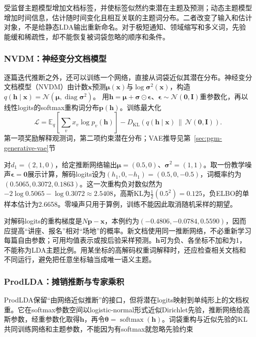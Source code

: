 受监督主题模型增加文档标签，并使标签似然约束潜在主题及预测；动态主题模型增加时间信息，估计随时间变化且相互关联的主题词分布。二者改变了输入和估计对象，不是给静态LDA输出重新命名。对于极短通知、领域缩写和多义词，先验能缓和稀疏性，却不能恢复被词袋忽略的顺序和条件。

\subsubsection{NVDM：神经变分文档模型}
\label{sec:nlp-classification-nvdm}

逐篇迭代推断之外，还可以训练一个网络，直接从词袋近似其潜在分布。神经变分文档模型（NVDM）由计数$\bm x$预测$\bm\mu(\bm x)$与$\log\bm\sigma^2(\bm x)$，构造
$q(\bm h\mid\bm x)=\mathcal N(\bm\mu,\operatorname{diag}\bm\sigma^2)$。
用$\bm h=\bm\mu+\bm\sigma\odot\bm\epsilon$、$\bm\epsilon\sim\mathcal N(\bm0,\bm I)$重参数化，再以线性logits的softmax重构词分布$\bm p(\bm h)$。训练最大化
\[
 \mathcal L=
 \mathbb E_q\!\left[\sum_vx_v\log p_v(\bm h)\right]
 -D_{\mathrm{KL}}(q(\bm h\mid\bm x)\,\|\,\mathcal N(\bm0,\bm I)).
\]
第一项奖励解释观测词，第二项约束潜在分布；VAE推导见第~\ref{sec:pgm-generative-vae}节

对$d_1=(2,1,0)$，给定推断网络输出$\bm\mu=(0.5,0)$、$\bm\sigma^2=(1,1)$。取一份教学噪声$\bm\epsilon=\bm0$展示计算，解码logits设为$(h_1,0,-h_1)=(0.5,0,-0.5)$，词概率约为$(0.5065,0.3072,0.1863)$。这一次重构负对数似然为$-2\log0.5065-\log0.3072\approx2.5408$，高斯KL为$\frac12(0.5^2)=0.125$，负ELBO的单样本估计为2.6658。零噪声只用于算例，训练不能因此取消随机采样的期望。

对解码logits的重构梯度是$N\bm p-\bm x$，本例约为$(-0.4806,-0.0784,0.5590)$，因而应提高“讲座、报名”相对“场地”的概率。新文档使用同一推断网络，不必重新学习每篇自由参数；可用均值表示或按后验采样预测。$\bm h$可为负、各坐标不加和为1，不能称为LDA主题比例。用某坐标的高解码权重词解释时，还应检查相关文档和不同运行，避免把任意坐标轴当成唯一语义主题。

\subsubsection{ProdLDA：摊销推断与专家乘积}
\label{sec:nlp-classification-prodlda}

ProdLDA保留“由网络近似推断”的接口，但将潜在logits映射到单纯形上的文档权重。它在softmax参数空间以logistic-normal形式近似Dirichlet先验，推断网络给高斯参数，经重参数化取得$\bm h$，再令$\bm\theta=\operatorname{softmax}(\bm h)$。词袋重构与近似先验的KL共同训练网络和主题参数，不能因为有softmax就忽略先验约束

